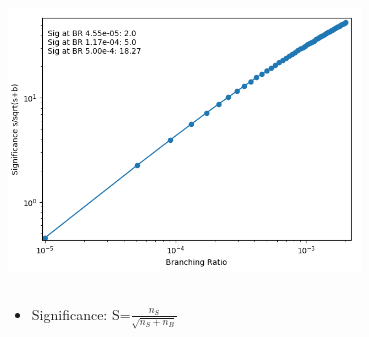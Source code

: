 \documentclass[10pt]{beamer}
\begin{document}
{\begin{columns}
\begin{column}{0.48\textwidth}
{}\\
\includegraphics[width=0.7\textwidth]{SmallNpart1modelouts/ejetsboth2hidnpart1SigVsBR.png}
\end{column}
\end{columns}
\begin{itemize}
\item Significance:  S=$\frac{n_{S}}{\sqrt{n_{S}+n_{B}}}$
\end{itemize}
}
\end{document}
